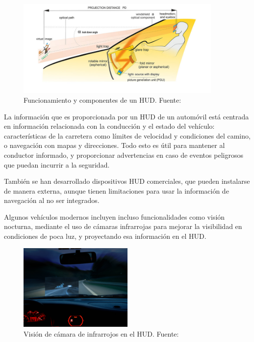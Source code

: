 \documentclass[12pt]{report} %
\begin{document}
\begin{figure}[h]
    \centering
    \includegraphics[width=0.9\textwidth]{hudWork.png}
    \caption{Funcionamiento y componentes de un HUD. Fuente: \cite{hudPaper}}
    \label{fig:imagen8}
\end{figure}

La información que es proporcionada por un HUD de un automóvil está centrada en información relacionada con la conducción y el estado del vehículo: características de la carretera como límites de velocidad y condiciones del camino, o navegación con mapas y direcciones. Todo esto es útil para mantener al conductor informado, y proporcionar advertencias en caso de eventos peligrosos que puedan incurrir a la seguridad.

También se han desarrollado dispositivos HUD comerciales, que pueden instalarse de manera externa, aunque tienen limitaciones para usar la información de navegación al no ser integrados. 

Algunos vehículos modernos incluyen incluso funcionalidades como visión nocturna, mediante el uso de cámaras infrarrojas para mejorar la visibilidad en condiciones de poca luz, y proyectando esa información en el HUD. 

\begin{figure}[h]
    \centering
    \includegraphics[width=0.5\textwidth]{nigthHUD.png}
    \caption{Visión de cámara de infrarrojos en el HUD. Fuente: \cite{hudPaper}}
    \label{fig:imagen9}
\end{figure}
\end{document}
